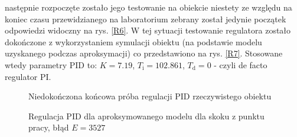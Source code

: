 następnie rozpoczęte zostało jego testowanie na obiekcie niestety ze względu na koniec czasu przewidzianego na laboratorium zebrany został jedynie początek odpowiedzi widoczny na rys. \ref{R6}. W tej sytuacji testowanie regulatora zostało dokończone z wykorzystaniem symulacji obiektu (na podstawie modelu uzyskanego podczas aproksymacji) co przedstawiono na rys. \ref{R7}. Stosowane wtedy parametry PID to: $K=\num{7,19}$, $T_\mathrm{i}=\num{102,861}$, $T_\mathrm{d}=0$ - czyli de facto regulator PI.

\begin{figure}[ht]
\centering
%
\caption{Niedokończona końcowa próba regulacji PID rzeczywistego obiektu}
\label{R9}
\end{figure}

\begin{figure}[ht]
\centering
%
\caption{Regulacja PID dla aproksymowanego modelu dla skoku z punktu pracy, błąd $E = 3527$}
\label{R10}
\end{figure}
